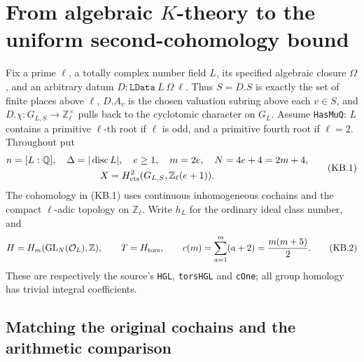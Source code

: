 \section{From algebraic \texorpdfstring{$K$}{K}-theory to the uniform second-cohomology bound}
\label{sec:k-theory-bridge}


Fix a prime $\ell$, a totally complex number field $L$, its specified
algebraic closure $\Omega$, and an arbitrary datum
$D:\texttt{LData}\ L\ \Omega\ \ell$.  Thus $S=D.S$ is exactly the set
of finite places above $\ell$, $D.A_v$ is the chosen valuation subring
above each $v\in S$, and $D.\chi:G_{L,S}\to\mathbb Z_\ell^\times$
pulls back to the cyclotomic character on $G_L$.
Assume \texttt{HasMuQ}: $L$ contains a primitive $\ell$-th root if
$\ell$ is odd, and a primitive fourth root if $\ell=2$.
Throughout put
\[
\begin{gathered}
 n=[L:\mathbb Q],\quad \Delta=|\operatorname{disc}L|,\quad
 e\ge1,\quad m=2e,\quad N=4e+4=2m+4,\\
 X=H^2_{\rm cts}(G_{L,S},\mathbb Z_\ell(e+1)).
\end{gathered}
 \tag{KB.1}
\]
The cohomology in (KB.1) uses continuous inhomogeneous cochains and
the compact $\ell$-adic topology on $\mathbb Z_\ell$.
Write $h_L$ for the ordinary ideal class number, and
\[
 H=H_m(\operatorname{GL}_N(\mathcal O_L),\mathbb Z),\qquad
 T=H_{\rm tors},\qquad
 c(m)=\sum_{a=1}^{m}(a+2)=\frac{m(m+5)}2.
 \tag{KB.2}
\]
These are respectively the source's \texttt{HGL}, \texttt{torsHGL}
and \texttt{cOne}; all group homology has trivial integral coefficients.

\subsection{Matching the original cochains and the arithmetic comparison}

